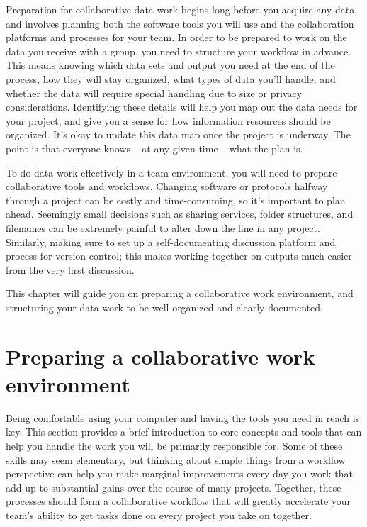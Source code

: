 
\begin{fullwidth}
Preparation for collaborative data work begins long before you acquire any data,
and involves planning both the software tools you will use
and the collaboration platforms and processes for your team.
In order to be prepared to work on the data you receive with a group,
you need to structure your workflow in advance.
This means knowing which data sets and output you need at the end of the process,
how they will stay organized, what types of data you'll handle,
and whether the data will require special handling due to size or privacy considerations.
Identifying these details will help you map out the data needs for your project,
and give you a sense for how information resources should be organized.
It's okay to update this data map once the project is underway.
The point is that everyone knows -- at any given time -- what the plan is.

To do data work effectively in a team environment, 
you will need to prepare collaborative tools and workflows.
Changing software or protocols halfway through a project can be costly and time-consuming,
so it's important to plan ahead.
Seemingly small decisions such as sharing services, folder structures, 
and filenames can be extremely painful to alter down the line in any project.
Similarly, making sure to set up a self-documenting discussion platform
and process for version control; 
this makes working together on outputs much easier from the very first discussion.

This chapter will guide you on preparing a collaborative work environment, 
and structuring your data work to be well-organized and clearly documented. 

\end{fullwidth}


\section{Preparing a collaborative work environment}

Being comfortable using your computer and having the tools you need in reach is key.
This section provides a brief introduction to core concepts and tools
that can help you handle the work you will be primarily responsible for.
Some of these skills may seem elementary,
but thinking about simple things from a workflow perspective
can help you make marginal improvements every day you work
that add up to substantial gains over the course of many projects.
Together, these processes should form a collaborative workflow
that will greatly accelerate your team's ability to get tasks done
on every project you take on together.

